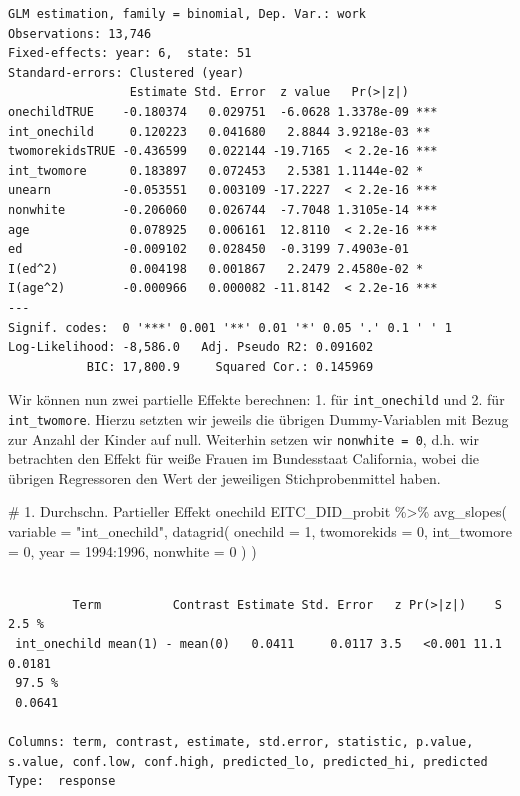 \documentclass[
  a4paper,
  DIV=11,
  oneside]{scrreprt}
\newenvironment{Shaded}{\begin{snugshade}}{\end{snugshade}}
\newcommand{\AttributeTok}[1]{\textcolor[rgb]{0.40,0.45,0.13}{#1}}
\newcommand{\CommentTok}[1]{\textcolor[rgb]{0.37,0.37,0.37}{#1}}
\newcommand{\DecValTok}[1]{\textcolor[rgb]{0.68,0.00,0.00}{#1}}
\newcommand{\FunctionTok}[1]{\textcolor[rgb]{0.28,0.35,0.67}{#1}}
\newcommand{\NormalTok}[1]{\textcolor[rgb]{0.00,0.23,0.31}{#1}}
\newcommand{\SpecialCharTok}[1]{\textcolor[rgb]{0.37,0.37,0.37}{#1}}
\newcommand{\StringTok}[1]{\textcolor[rgb]{0.13,0.47,0.30}{#1}}
\begin{document}
\begin{verbatim}
GLM estimation, family = binomial, Dep. Var.: work
Observations: 13,746
Fixed-effects: year: 6,  state: 51
Standard-errors: Clustered (year) 
                 Estimate Std. Error  z value   Pr(>|z|)    
onechildTRUE    -0.180374   0.029751  -6.0628 1.3378e-09 ***
int_onechild     0.120223   0.041680   2.8844 3.9218e-03 ** 
twomorekidsTRUE -0.436599   0.022144 -19.7165  < 2.2e-16 ***
int_twomore      0.183897   0.072453   2.5381 1.1144e-02 *  
unearn          -0.053551   0.003109 -17.2227  < 2.2e-16 ***
nonwhite        -0.206060   0.026744  -7.7048 1.3105e-14 ***
age              0.078925   0.006161  12.8110  < 2.2e-16 ***
ed              -0.009102   0.028450  -0.3199 7.4903e-01    
I(ed^2)          0.004198   0.001867   2.2479 2.4580e-02 *  
I(age^2)        -0.000966   0.000082 -11.8142  < 2.2e-16 ***
---
Signif. codes:  0 '***' 0.001 '**' 0.01 '*' 0.05 '.' 0.1 ' ' 1
Log-Likelihood: -8,586.0   Adj. Pseudo R2: 0.091602
           BIC: 17,800.9     Squared Cor.: 0.145969
\end{verbatim}

Wir können nun zwei partielle Effekte berechnen: 1. für
\texttt{int\_onechild} und 2. für \texttt{int\_twomore}. Hierzu setzten
wir jeweils die übrigen Dummy-Variablen mit Bezug zur Anzahl der Kinder
auf null. Weiterhin setzen wir \texttt{nonwhite\ =\ 0}, d.h. wir
betrachten den Effekt für weiße Frauen im Bundesstaat California, wobei
die übrigen Regressoren den Wert der jeweiligen Stichprobenmittel haben.

\begin{Shaded}
\begin{Highlighting}[]
\CommentTok{\# 1. Durchschn. Partieller Effekt onechild}
\NormalTok{EITC\_DID\_probit }\SpecialCharTok{\%\textgreater{}\%} 
  \FunctionTok{avg\_slopes}\NormalTok{(}
    \AttributeTok{variable =} \StringTok{"int\_onechild"}\NormalTok{,}
    \FunctionTok{datagrid}\NormalTok{(}
      \AttributeTok{onechild =} \DecValTok{1}\NormalTok{, }
      \AttributeTok{twomorekids =} \DecValTok{0}\NormalTok{, }
      \AttributeTok{int\_twomore =} \DecValTok{0}\NormalTok{,}
      \AttributeTok{year =} \DecValTok{1994}\SpecialCharTok{:}\DecValTok{1996}\NormalTok{,}
      \AttributeTok{nonwhite =} \DecValTok{0}
\NormalTok{    )}
\NormalTok{  )}
\end{Highlighting}
\end{Shaded}

\begin{verbatim}

         Term          Contrast Estimate Std. Error   z Pr(>|z|)    S  2.5 %
 int_onechild mean(1) - mean(0)   0.0411     0.0117 3.5   <0.001 11.1 0.0181
 97.5 %
 0.0641

Columns: term, contrast, estimate, std.error, statistic, p.value, s.value, conf.low, conf.high, predicted_lo, predicted_hi, predicted 
Type:  response 
\end{verbatim}
\end{document}
